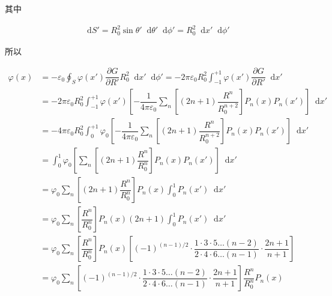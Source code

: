 \documentclass{article}
\newcommand*{\md}{\mathop{}\!\mathrm{d}}
\begin{document}
其中

\begin{equation*}
  \begin{aligned}
    \md S' = R_0^2 \sin \theta' \md \theta' \md \phi' = R_0^2 \md x' \md \phi'
  \end{aligned}
\end{equation*}

所以

\begin{equation*}
  \begin{aligned}
    \varphi \left( x \right) &= - \varepsilon_0 \oint_S \varphi \left( x' \right) \dfrac{\partial G}{\partial R'} R_0^2 \md x' \md \phi'
    = - 2 \pi \varepsilon_0 R_0^2 \int_{-1}^{+1} \varphi \left( x' \right) \dfrac{\partial G}{\partial R'} \md x' \\
    &= - 2 \pi \varepsilon_0 R_0^2 \int_{-1}^{+1} \varphi \left( x' \right) \left[ - \dfrac{1}{4\pi \varepsilon_0} \sum_n \left[ \left( 2n+1 \right) \dfrac{R^n }{R_0^{n+2}} \right] P_n \left( x \right) P_n \left( x' \right) \right] \md x' \\
    &= - 4 \pi \varepsilon_0 R_0^2 \int_0^{+1} \varphi_0  \left[ - \dfrac{1}{4\pi \varepsilon_0} \sum_n \left[ \left( 2n+1 \right) \dfrac{R^n }{R_0^{n+2}} \right] P_n \left( x \right) P_n \left( x' \right) \right] \md x' \\
    &= \int_0^1 \varphi_0  \left[ \sum_n \left[ \left( 2n+1 \right) \dfrac{R^n }{R_0^n} \right] P_n \left( x \right) P_n \left( x' \right) \right] \md x' \\
    &= \varphi_0 \sum_n  \left[ \left( 2n+1 \right) \dfrac{R^n }{R_0^n} \right] P_n \left( x \right) \int_0^1  P_n \left( x' \right) \md x' \\
    &= \varphi_0 \sum_n  \left[  \dfrac{R^n }{R_0^n} \right] P_n \left( x \right) \left( 2n+1 \right) \int_0^1  P_n \left( x' \right) \md x' \\
    &= \varphi_0 \sum_n  \left[ \dfrac{R^n }{R_0^n} \right] P_n \left( x \right) \left[ \left( -1  \right)^{\left( n-1 \right)/ 2} \cdot \dfrac{1 \cdot 3 \cdot 5 \dots \left( n-2 \right)}{2 \cdot 4 \cdot 6 \dots \left( n-1 \right)} \cdot \dfrac{2n+1}{n+1} \right] \\
    &= \varphi_0 \sum_n  \left[ \left( -1  \right)^{\left( n-1 \right)/ 2} \cdot \dfrac{1 \cdot 3 \cdot 5 \dots \left( n-2 \right)}{2 \cdot 4 \cdot 6 \dots \left( n-1 \right)} \cdot \dfrac{2n+1}{n+1} \right] \dfrac{R^n }{R_0^n} P_n \left( x \right) 
  \end{aligned}
\end{equation*}
\end{document}
